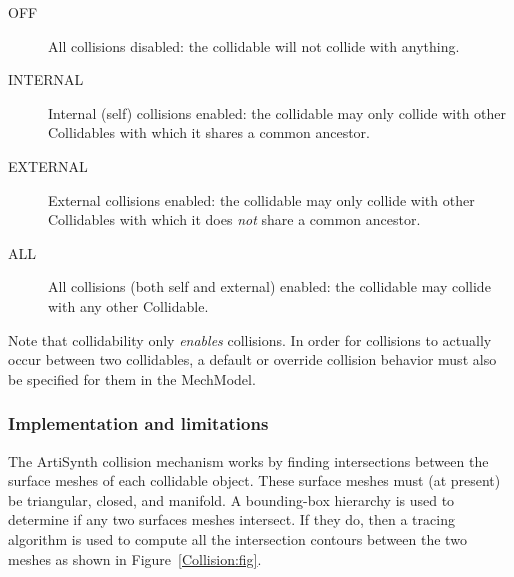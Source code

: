 \begin{description}

\item[OFF]\mbox{}

All collisions disabled: the collidable will not collide with
anything.

\item[INTERNAL]\mbox{}

Internal (self) collisions enabled: the collidable may only collide
with other Collidables with which it shares a common ancestor.

\item[EXTERNAL]\mbox{}

External collisions enabled: the collidable may only collide with
other Collidables with which it does {\it not} share a common
ancestor.

\item[ALL]\mbox{}

All collisions (both self and external) enabled: the collidable may
collide with any other Collidable.

\end{description}

Note that collidability only {\it enables} collisions.  In order for
collisions to actually occur between two collidables, a default or
override collision behavior must also be specified for them in the
MechModel.

\subsubsection{Implementation and limitations}

The ArtiSynth collision mechanism works by finding intersections
between the surface meshes of each collidable object.  These surface
meshes must (at present) be triangular, closed, and manifold.
A bounding-box 
hierarchy is used to determine if any two surfaces meshes
intersect. If they do, then a tracing algorithm
is used to compute all the intersection contours
between the two meshes as shown in Figure~\ref{Collision:fig}.

